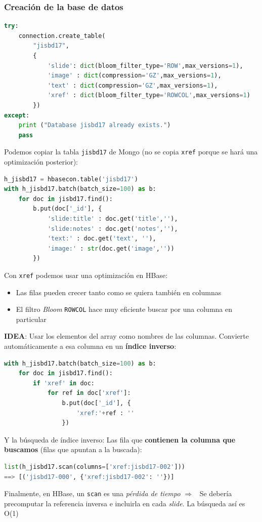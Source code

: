 \documentclass[14pt]{beamer}
\newcommand{\ra}{{\color{blue} $\Rightarrow${}~{}}}
\begin{document}
\begin{frame}
  \frametitle{Creación de la base de datos}
\begin{lstlisting}[language=python]
try:
    connection.create_table(
        "jisbd17",
        {
            'slide': dict(bloom_filter_type='ROW',max_versions=1),
            'image' : dict(compression='GZ',max_versions=1),
            'text' : dict(compression='GZ',max_versions=1),
            'xref' : dict(bloom_filter_type='ROWCOL',max_versions=1)
        })
except:
    print ("Database jisbd17 already exists.")
    pass
\end{lstlisting}

  \framebreak

Podemos copiar la tabla {\tt jisbd17} de Mongo (no se copia {\tt xref}
porque se hará una optimización posterior):

\begin{lstlisting}[language=python]
h_jisbd17 = hbasecon.table('jisbd17')
with h_jisbd17.batch(batch_size=100) as b:
    for doc in jisbd17.find():
        b.put(doc['_id'], {
            'slide:title' : doc.get('title',''),
            'slide:notes' : doc.get('notes',''),
            'text:' : doc.get('text', ''),
            'image:' : str(doc.get('image',''))
        })
\end{lstlisting}

\framebreak

Con {\tt xref} podemos usar una optimización en HBase:

\begin{itemize}
\item Las filas pueden crecer tanto como se quiera también en columnas
\item El filtro {\em Bloom} {\tt ROWCOL} hace muy eficiente buscar por una
  columna en particular
\end{itemize}

{\bf IDEA}: Usar los elementos del array como nombres de las columnas.
Convierte automáticamente a esa columna en un {\bf índice inverso}:

\framebreak

\begin{lstlisting}[language=python]
with h_jisbd17.batch(batch_size=100) as b:
    for doc in jisbd17.find():
        if 'xref' in doc:
            for ref in doc['xref']:
                b.put(doc['_id'], {
                    'xref:'+ref : ''
                })
\end{lstlisting}

Y la búsqueda de índice inverso: Las fila que {\bf contienen la
  columna que buscamos} (filas que apuntan a la buscada):

\begin{lstlisting}[language=python]
list(h_jisbd17.scan(columns=['xref:jisbd17-002']))
==> [('jisbd17-000', {'xref:jisbd17-002': ''})]
\end{lstlisting}

Finalmente, en HBase, un {\tt scan} es una {\em pérdida de tiempo} \ra{} Se
debería precomputar la referencia inversa e incluirla en cada {\em slide}.
La búsqueda así es O(1)

\end{frame}
\end{document}
